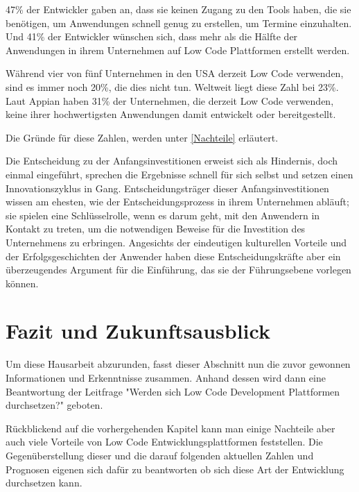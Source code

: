 \documentclass[12pt]{article} %
\begin{document}
	47\% der Entwickler gaben an, dass sie keinen Zugang zu den Tools haben, die sie benötigen, um Anwendungen schnell genug zu erstellen, um Termine einzuhalten. Und 41\% der Entwickler wünschen sich, dass mehr als die Hälfte der Anwendungen in ihrem Unternehmen auf Low Code Plattformen erstellt werden. \autocite{KevinShuler.2023} \newline
	
	Während vier von fünf Unternehmen in den USA derzeit Low Code verwenden, sind es immer noch 20\%, die dies nicht tun. Weltweit liegt diese Zahl bei 23\%. Laut Appian haben 31\% der Unternehmen, die derzeit Low Code verwenden, keine ihrer hochwertigsten Anwendungen damit entwickelt oder bereitgestellt. \autocite{KevinShuler.2023}
	
	Die Gründe für diese Zahlen, werden unter \ref{Nachteile} erläutert. \newline
	
	Die Entscheidung zu der Anfangsinvestitionen erweist sich als Hindernis, doch einmal eingeführt, sprechen die Ergebnisse schnell für sich selbst und setzen einen Innovationszyklus in Gang. Entscheidungsträger dieser Anfangsinvestitionen wissen am ehesten, wie der Entscheidungsprozess in ihrem Unternehmen abläuft; sie spielen eine Schlüsselrolle, wenn es darum geht, mit den Anwendern in Kontakt zu treten, um die notwendigen Beweise für die Investition des Unternehmens zu erbringen. Angesichts der eindeutigen kulturellen Vorteile und der Erfolgsgeschichten der Anwender haben diese Entscheidungskräfte aber ein überzeugendes Argument für die Einführung, das sie der Führungsebene vorlegen können. \autocite{Microsoft.2022}
		
	
	\section{Fazit und Zukunftsausblick}
	Um diese Hausarbeit abzurunden, fasst dieser Abschnitt nun die zuvor gewonnen Informationen und Erkenntnisse zusammen. Anhand dessen wird dann eine Beantwortung der Leitfrage "Werden sich Low Code Development Plattformen durchsetzen?" geboten. \newline
	
	Rückblickend auf die vorhergehenden Kapitel kann man einige Nachteile aber auch viele Vorteile von Low Code Entwicklungsplattformen feststellen. Die Gegenüberstellung dieser und die darauf folgenden aktuellen Zahlen und Prognosen eigenen sich dafür zu beantworten ob sich diese Art der Entwicklung durchsetzen kann. \newline
	
\end{document}
